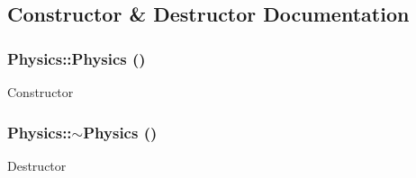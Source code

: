 \subsection{Constructor \& Destructor Documentation}
\hypertarget{class_physics_a4b2ebc0a344f04f48d227c72f0d0fbda}{
\subsubsection[{Physics}]{\setlength{\rightskip}{0pt plus 5cm}Physics::Physics ()}}
\label{class_physics_a4b2ebc0a344f04f48d227c72f0d0fbda}
Constructor \hypertarget{class_physics_a045c3788e28059d3920136499942490f}{
\subsubsection[{$\sim$Physics}]{\setlength{\rightskip}{0pt plus 5cm}Physics::$\sim$Physics ()}}
\label{class_physics_a045c3788e28059d3920136499942490f}
Destructor 

